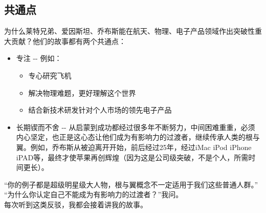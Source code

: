 \hypertarget{ux5171ux901aux70b9}{%
\subsection{共通点}\label{ux5171ux901aux70b9}}

为什么莱特兄弟、爱因斯坦、乔布斯能在航天、物理、电子产品领域作出突破性重大贡献？他们的故事都有两个共通点： 

\begin{itemize}
\tightlist
\item
  专注 -\/- 例如：

  \begin{itemize}
  \tightlist
  \item
    专心研究飞机
  \item
    解决物理难题，更好理解这个世界
  \item
    结合新技术研发针对个人市场的领先电子产品
  \end{itemize}
\item
  长期锲而不舍 -\/-
  从启蒙到成功都经过很多年不断努力，中间困难重重，必须内心坚定，也正是这心态让他们成为有影响力的过渡者，继续传承人类的根与翼。例如，乔布斯从被迫离开开始，前后经过25年，经过iMac iPod iPhone iPAD等，最终才使苹果再创辉煌（因为这是公司级突破，不是个人，所需时间更长）。

\end{itemize}

“你的例子都是超级明星级大人物，根与翼概念不一定适用于我们这些普通人群。”\\
“为什么你认定自己不能成为有影响力的过渡者？”我问。\\
每次听到这类反驳，我都会接着讲我的故事。 


